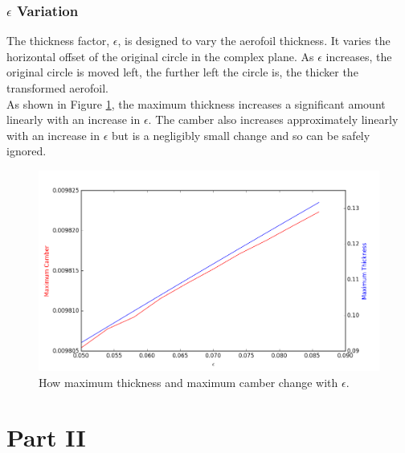 \documentclass[10pt,a4paper]{article}
\begin{document}
\subsubsection{$\epsilon$ Variation}
The thickness factor, $\epsilon$, is designed to vary the aerofoil thickness. It varies the horizontal offset of the original circle in the complex plane. As $\epsilon$ increases, the original circle is moved left, the further left the circle is, the thicker the transformed aerofoil.
\\As shown in Figure \ref{fig:epsilon_variation}, the maximum thickness increases a significant amount linearly with an increase in $\epsilon$. The camber also increases approximately linearly with an increase in $\epsilon$ but is a negligibly small change and so can be safely ignored.
\begin{figure}[!htb]
\centering
\includegraphics[scale=0.4925]{Figures/epsilon_variation.png}
\caption{How maximum thickness and maximum camber change with $\epsilon$.}
\label{fig:epsilon_variation}
\end{figure}
\section{Part II}
\end{document}
